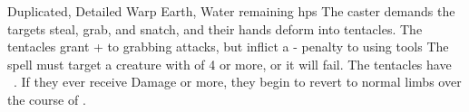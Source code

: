   {Duplicated, Detailed}%
  {Warp}%
  {Earth, Water}%
  {remaining \glspl{hp}}%
  {The caster demands the targets steal, grab, and snatch, and their hands deform into  tentacles.
  The tentacles grant + to grabbing attacks, but inflict a - penalty to using tools}%
  {
  The spell must target a creature with  of 4 or more, or it will fail.
  The tentacles have ~.
  If they ever receive  Damage or more, they begin to revert to normal limbs over the course of .}
